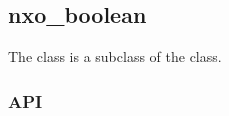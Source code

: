 %
%
%
%
%              

\subsection{nxo\_boolean}
\label{nxo_boolean}

The  class is a subclass of the  class.

\subsubsection{API}
